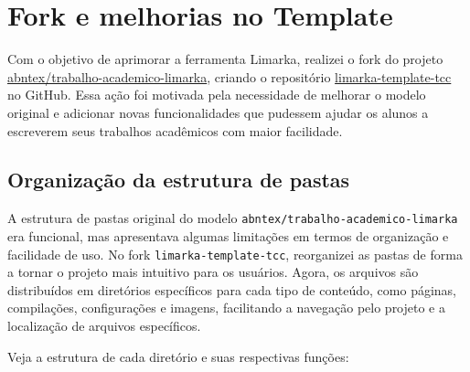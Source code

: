 \documentclass[
	12pt,				%
	oneside,			%
	a4paper,			%
	english,			%
	french,				%
	spanish,			%
	brazil				%
	]{abntex2}
\begin{document}
\hypertarget{fork-e-melhorias-no-template}{%
\section{Fork e melhorias no
Template}\label{fork-e-melhorias-no-template}}

Com o objetivo de aprimorar a ferramenta Limarka, realizei o fork do
projeto
\href{https://github.com/abntex/trabalho-academico-limarka}{abntex/trabalho-academico-limarka},
criando o repositório
\href{https://github.com/ReinanHS/limarka-template-tcc}{limarka-template-tcc}
no GitHub. Essa ação foi motivada pela necessidade de melhorar o modelo
original e adicionar novas funcionalidades que pudessem ajudar os alunos
a escreverem seus trabalhos acadêmicos com maior facilidade.

\hypertarget{organizauxe7uxe3o-da-estrutura-de-pastas}{%
\subsection{Organização da estrutura de
pastas}\label{organizauxe7uxe3o-da-estrutura-de-pastas}}

A estrutura de pastas original do modelo
\texttt{abntex/trabalho-academico-limarka} era funcional, mas
apresentava algumas limitações em termos de organização e facilidade de
uso. No fork \texttt{limarka-template-tcc}, reorganizei as pastas de
forma a tornar o projeto mais intuitivo para os usuários. Agora, os
arquivos são distribuídos em diretórios específicos para cada tipo de
conteúdo, como páginas, compilações, configurações e imagens,
facilitando a navegação pelo projeto e a localização de arquivos
específicos.

Veja a estrutura de cada diretório e suas respectivas funções:
\end{document}

